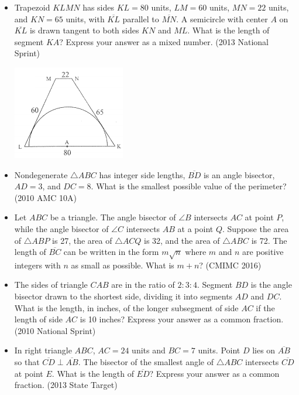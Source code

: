 \documentclass{article}
\begin{document}
\begin{itemize}

\item Trapezoid $KLMN$ has sides $KL=80$ units, $LM=60$ units, $MN=22$ units, and $KN=65$ units, with $\overline{KL}$ parallel to $\overline{MN}$. A semicircle with center $A$ on $\overline{KL}$ is drawn tangent to both sides $KN$ and $ML$. What is the length of segment $KA$? Express your answer as a mixed number. (2013 National Sprint)

\centerline{\includegraphics{201329.png}}

\item Nondegenerate $\triangle ABC$ has integer side lengths, $\overline{BD}$ is an angle bisector, $AD = 3$, and $DC=8$. What is the smallest possible value of the perimeter? (2010 AMC 10A)

\item Let $ABC$ be a triangle. The angle bisector of $\angle B$ intersects $AC$ at point $P$, while the angle bisector of $\angle C$ intersects $AB$ at a point $Q$. Suppose the area of $\triangle ABP$ is 27, the area of $\triangle ACQ$ is 32, and the area of $\triangle ABC$ is 72. The length of $\overline{BC}$ can be written in the form $m\sqrt{n}$ where $m$ and $n$ are positive integers with $n$ as small as possible. What is $m+n$? (CMIMC 2016)

\item The sides of triangle $CAB$ are in the ratio of $2:3:4$. Segment $BD$ is the angle bisector drawn to the shortest side, dividing it into segments $AD$ and $DC$. What is the length, in inches, of the longer subsegment of side $AC$ if the length of side $AC$ is 10 inches? Express your answer as a common fraction. (2010 National Sprint)

\item In right triangle $ABC$, $AC=24$ units and $BC=7$ units. Point $D$ lies on $\overline{AB}$ so that $\overline{CD}\perp\overline{AB}$. The bisector of the smallest angle of $\triangle ABC$ intersects $\overline{CD}$ at point $E$. What is the length of $\overline{ED}$? Express your answer as a common fraction. (2013 State Target)



\end{itemize}
\end{document}
